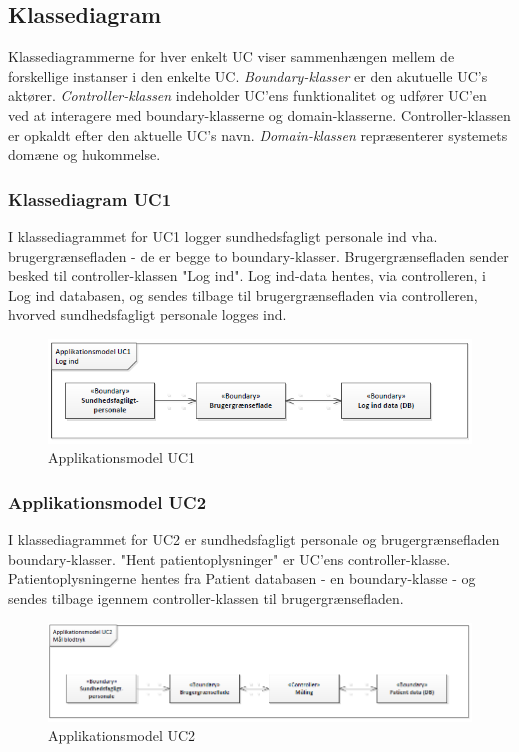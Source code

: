 \subsection{Klassediagram}
Klassediagrammerne for hver enkelt UC viser sammenhængen mellem de forskellige instanser i den enkelte UC. \newline 
\textit{Boundary-klasser} er den akutuelle UC's aktører. \newline 
\textit{Controller-klassen} indeholder UC'ens funktionalitet og udfører UC'en ved at interagere med boundary-klasserne og domain-klasserne. Controller-klassen er opkaldt efter den aktuelle UC's navn. \newline
\textit{Domain-klassen} repræsenterer systemets domæne og hukommelse. 
\subsubsection{Klassediagram UC1}
I klassediagrammet for UC1 logger sundhedsfagligt personale ind vha. brugergrænsefladen - de er begge to boundary-klasser. Brugergrænsefladen sender besked til controller-klassen "Log ind". Log ind-data hentes, via controlleren, i Log ind databasen, og sendes tilbage til brugergrænsefladen via controlleren, hvorved sundhedsfagligt personale logges ind. 
\begin{figure}[H]
\centering
\includegraphics[scale=0.70]{app1.PNG}
\caption{Applikationsmodel UC1}
\end{figure}

\subsubsection{Applikationsmodel UC2}
I klassediagrammet for UC2 er sundhedsfagligt personale og brugergrænsefladen boundary-klasser. "Hent patientoplysninger" er UC'ens controller-klasse. Patientoplysningerne hentes fra Patient databasen - en boundary-klasse - og sendes tilbage igennem controller-klassen til brugergrænsefladen. 
\begin{figure}[H]
\centering
\includegraphics[scale=0.70]{app2.PNG}
\caption{Applikationsmodel UC2}
\end{figure}

